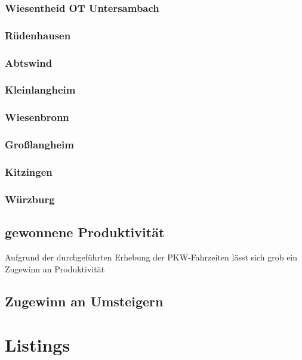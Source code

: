 \documentclass[fontsize=12pt,a4paper]{scrreprt}
\begin{document}
                \subsection{Wiesentheid OT Untersambach}
                \subsection{Rüdenhausen}
                \subsection{Abtswind}
                \subsection{Kleinlangheim}
                \subsection{Wiesenbronn}
                \subsection{Großlangheim}
                \subsection{Kitzingen}
                \subsection{Würzburg}
        
        
        \section{gewonnene Produktivität}
Aufgrund der durchgeführten Erhebung der PKW-Fahrzeiten lässt sich grob ein Zugewinn an Produktivität 

        \section{Zugewinn an Umsteigern}


        \chapter{Listings}
        
    
\end{document}
